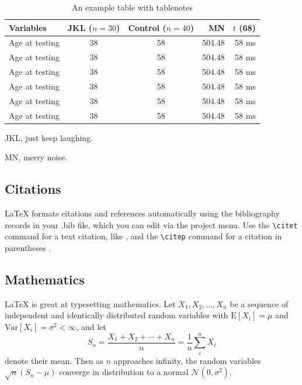 \documentclass[fleqn,10pt]{amj}
\begin{document}
\begin{table}[hbt!]\centering
\begin{threeparttable}
\caption{An example table with tablenotes}\label{tab:withnotes}

\begin{tabular}{lccrr}
\toprule
Variables & JKL ($n=30$) & Control ($n=40$) & MN & $t$ (68)\\
\midrule
Age at testing & 38 & 58\tnote{1} & 504.48 & 58 ms\\
Age at testing & 38 & 58 & 504.48 & 58 ms\\
Age at testing & 38 & 58 & 504.48 & 58 ms\\
Age at testing & 38 & 58 & 504.48 & 58 ms\\
Age at testing\tnote{2} & 38 & 58 & 504.48 & 58 ms\\
Age at testing & 38 & 58 & 504.48 & 58 ms\\
\bottomrule
\end{tabular}
\begin{tablenotes}
\item[1] JKL, just keep laughing.
\item[2] MN, merry noise.
\end{tablenotes}
\end{threeparttable}
\end{table}

\subsection{Citations}

LaTeX formats citations and references automatically using the bibliography records in your .bib file, which you can edit via the project menu. Use the \verb|\citet| command for a text citation, like \citet{lees2010theoretical}, and the \verb|\citep| command for a citation in parentheses \citep{McQuilton01012012}.\cite{Bloss029983}

\subsection{Mathematics}

\LaTeX{} is great at typesetting mathematics. Let $X_1, X_2, \ldots, X_n$ be a sequence of independent and identically distributed random variables with $\text{E}[X_i] = \mu$ and $\text{Var}[X_i] = \sigma^2 < \infty$, and let
\begin{equation}\label{eq:sum}
S_n = \frac{X_1 + X_2 + \cdots + X_n}{n}
      = \frac{1}{n}\sum_{i}^{n} X_i
\end{equation}
denote their mean. Then as $n$ approaches infinity, the random variables $\sqrt{n}(S_n - \mu)$ converge in distribution to a normal $\mathcal{N}(0, \sigma^2)$.
\end{document}
